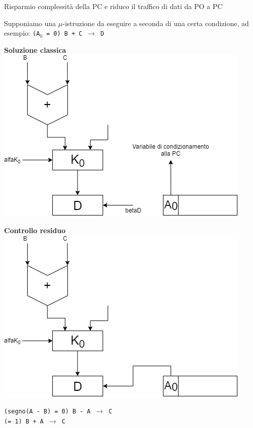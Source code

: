 \documentclass[10pt]{report}
\begin{document}
\begin{list}{}{}
\begin{multicols}{2}
\begin{center}
	\end{center}
	Risparmio complessità della PC e riduco il traffico di dati da PO a PC
	\end{multicols}
	\pagebreak
	\item Supponiamo una $\mu$-istruzione da eseguire a seconda di una certa condizione, ad esempio: \texttt{(A$_0$ = 0) B + C $\rightarrow$ D}
	\begin{multicols}{2}
	\begin{center}
	\textbf{Soluzione classica}\\
	\includegraphics[scale=0.5]{contrres_es2.png}
	\end{center}
	\columnbreak
	\begin{center}
	\textbf{Controllo residuo}\\
	\includegraphics[scale=0.5]{contrres_es2b.png}
	\end{center}
	\end{multicols}
	\item \texttt{(segno(A - B) = 0) B - A $\rightarrow$ C\\(= 1) B + A $\rightarrow$ C}

\end{list}
\end{document}
